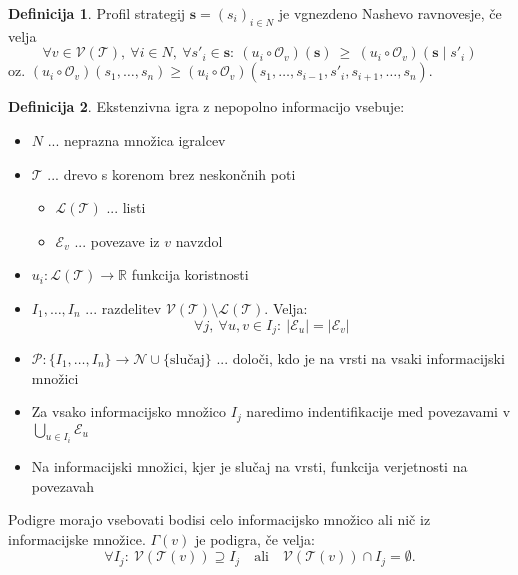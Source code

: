 \documentclass[11pt]{article}
\newcommand{\R}{\mathbb{R}}
\newcommand{\N}{\mathbb{N}}
\newcommand{\set}[1]{\{#1\}}
\renewcommand{\P}{\mathcal{P}}
\renewcommand{\O}{\mathcal{O}}
\newcommand{\TT}{\mathcal{T}}
\newcommand{\V}{\mathscr{V}}
\renewcommand{\L}{\mathscr{L}}
\newcommand{\E}{\mathscr{E}}
\newcommand{\1}{\mathbbm{1}}
\renewcommand{\N}{\mathcal{N}}
\theoremstyle{definition}
\newtheorem{definicija}{Definicija}[section]
\theoremstyle{definition}
\theoremstyle{definition}
\theoremstyle{definition}
\begin{document}
\begin{definicija}

Profil strategij $\mathbf{s} = (s_i)_{i \in N}$ je vgnezdeno Nashevo ravnovesje, če velja
$$\forall v \in \V(\TT),~\forall i \in N,~\forall s'_i \in \mathbf{s}:~(u_i \circ \O_v)(\mathbf{s}) ~\geq~ (u_i \circ \O_v)(\mathbf{s} \mid s'_i)$$
oz. $(u_i \circ \O_v)(s_1,\ldots,s_n) \geq (u_i \circ \O_v)(s_1,\ldots,s_{i-1},s'_i,s_{i+1},\ldots,s_n)$.

\end{definicija}
\vspace{0.5cm}

\begin{definicija}

Ekstenzivna igra z nepopolno informacijo vsebuje:
\begin{itemize}
	\item $N$ ... neprazna množica igralcev
	\item $\TT$ ... drevo s korenom brez neskončnih poti
	\begin{itemize}
		\item $\L(\TT)$ ... listi
		\item $\E_v$ ... povezave iz $v$ navzdol
	\end{itemize}
	\item $u_i: \L(\TT) \rightarrow \R$ funkcija koristnosti
	\item $I_1,\ldots,I_n$ ... razdelitev $\V(\TT)\setminus\L(\TT)$. Velja:
	$$\forall j,~\forall u,v \in I_j: ~|\E_u| = |\E_v|$$
	\item $\P: \set{I_1,\ldots,I_n} \rightarrow \N \cup \set{\text{slučaj}}$ ... določi, kdo je na vrsti na vsaki informacijski množici
	\item Za vsako informacijsko množico $I_j$ naredimo indentifikacije med povezavami v $\bigcup_{u \in I_i} \E_u$
	\item Na informacijski množici, kjer je slučaj na vrsti, funkcija verjetnosti na povezavah
\end{itemize}

Podigre morajo vsebovati bodisi celo informacijsko množico ali nič iz informacijske množice. $\Gamma(v)$ je podigra, če velja:
$$\forall I_j: ~\V(\TT(v)) \supseteq I_j \quad\text{ali}\quad \V(\TT(v)) \cap I_j = \emptyset.$$

\end{definicija}
\vspace{0.5cm}

\pagebreak

\end{document}
